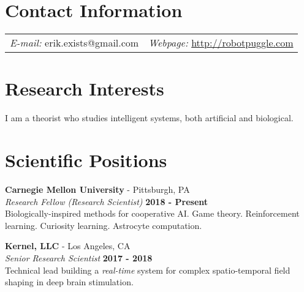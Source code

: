 \documentclass[margin,line]{res}
\begin{document}
\newcommand{\link}[1]{\texttt{#1}}
\providecommand{\tightlist}{%
      \setlength{\itemsep}{0pt}\setlength{\parskip}{0pt}}



\begin{resume}
\section{\sc Contact Information}
\vspace{.05in}
\begin{tabular}{@{}p{2in}p{4in}}
{\it E-mail:}  erik.exists@gmail.com   & {\it Webpage:} \href{http://robotpuggle.com}{http://robotpuggle.com} \\
\end{tabular}


\section{\sc Research Interests}
I am a theorist who studies intelligent systems, both artificial and biological. 





\section{\sc Scientific Positions}

{\bf Carnegie Mellon University} - Pittsburgh, PA \\
{\em Research Fellow (Research Scientist)} \hfill {\bf 2018 - Present}\\
Biologically-inspired methods for cooperative AI. Game theory. Reinforcement learning. Curiosity learning. Astrocyte computation.

{\bf Kernel, LLC} - Los Angeles, CA\\
{\em Senior Research Scientist} \hfill {\bf 2017 - 2018}\\
Technical lead building a \emph{real-time} system for complex spatio-temporal field shaping in deep brain stimulation.


\end{resume}
\end{document}
